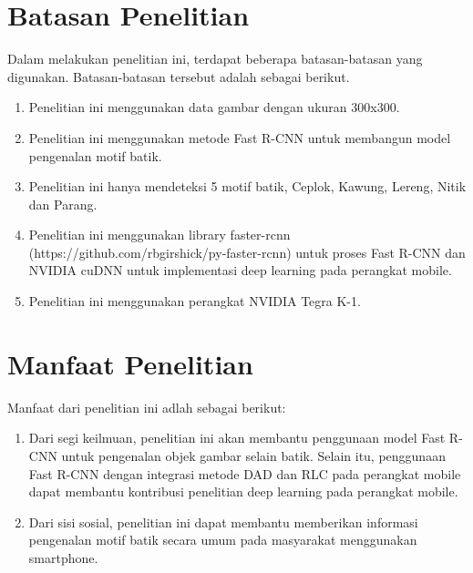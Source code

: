 \section{Batasan Penelitian}
Dalam melakukan penelitian ini, terdapat beberapa batasan-batasan yang digunakan. Batasan-batasan tersebut adalah sebagai berikut.
\begin{enumerate}
	\item Penelitian ini menggunakan data gambar dengan ukuran 300x300.
	\item Penelitian ini menggunakan metode Fast R-CNN untuk membangun model pengenalan motif batik.
	\item Penelitian ini hanya mendeteksi 5 motif batik, Ceplok, Kawung, Lereng, Nitik dan Parang.
	\item Penelitian ini menggunakan library faster-rcnn (https://github.com/rbgirshick/py-faster-rcnn) untuk proses Fast R-CNN dan NVIDIA cuDNN untuk implementasi deep learning pada perangkat mobile.
	\item Penelitian ini menggunakan perangkat NVIDIA Tegra K-1.
\end{enumerate}

\section{Manfaat Penelitian}
Manfaat dari penelitian ini adlah sebagai berikut:
\begin{enumerate}
	\item Dari segi keilmuan, penelitian ini akan membantu penggunaan model Fast R-CNN untuk pengenalan objek gambar selain batik. Selain itu, penggunaan Fast R-CNN dengan integrasi metode DAD dan RLC pada perangkat mobile dapat membantu kontribusi penelitian deep learning pada perangkat mobile.
	\item Dari sisi sosial, penelitian ini dapat membantu memberikan informasi pengenalan motif batik secara umum pada masyarakat menggunakan smartphone.
\end{enumerate}

